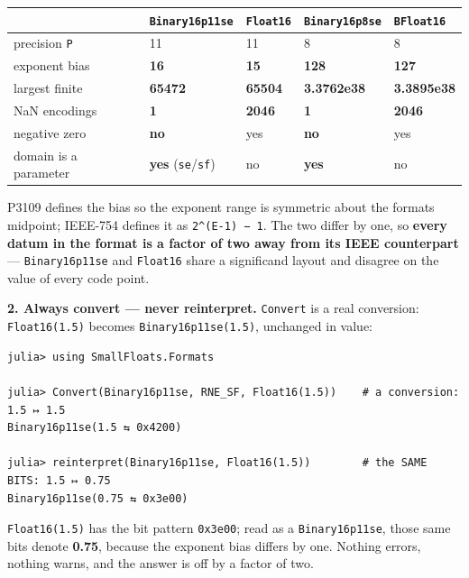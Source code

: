 \begin{table}[h]
\centering
\begin{tabulary}{\linewidth}{L L L L L}
\toprule
 & \texttt{Binary16p11se} & \texttt{Float16} & \texttt{Binary16p8se} & \texttt{BFloat16} \\
\toprule
precision \texttt{P} & 11 & 11 & 8 & 8 \\
exponent bias & \textbf{16} & \textbf{15} & \textbf{128} & \textbf{127} \\
largest finite & \textbf{65472} & \textbf{65504} & \textbf{3.3762e38} & \textbf{3.3895e38} \\
NaN encodings & \textbf{1} & \textbf{2046} & \textbf{1} & \textbf{2046} \\
negative zero & \textbf{no} & yes & \textbf{no} & yes \\
domain is a parameter & \textbf{yes} (\texttt{se}/\allowbreak\texttt{sf}) & no & \textbf{yes} & no \\
\bottomrule
\end{tabulary}

\end{table}



P3109 defines the bias so the exponent range is symmetric about the format{\textquotesingle}s midpoint; IEEE-754 defines it as \texttt{2{\textasciicircum}(E-1) − 1}. The two differ by one, so \textbf{every datum in the format is a factor of two away from its IEEE counterpart} — \texttt{Binary16p11se} and \texttt{Float16} share a significand layout and disagree on the value of every code point.



\textbf{2. Always convert — never reinterpret.} \texttt{Convert} is a real conversion: \texttt{Float16(1.5)} becomes \texttt{Binary16p11se(1.5)}, unchanged in value:




\nopagebreak[4]
\begin{verbatim}
julia> using SmallFloats.Formats

julia> Convert(Binary16p11se, RNE_SF, Float16(1.5))    # a conversion: 1.5 ↦ 1.5
Binary16p11se(1.5 ⇆ 0x4200)

julia> reinterpret(Binary16p11se, Float16(1.5))        # the SAME BITS: 1.5 ↦ 0.75
Binary16p11se(0.75 ⇆ 0x3e00)
\end{verbatim}



\texttt{Float16(1.5)} has the bit pattern \texttt{0x3e00}; read as a \texttt{Binary16p11se}, those same bits denote \textbf{0.75}, because the exponent bias differs by one. Nothing errors, nothing warns, and the answer is off by a factor of two.



